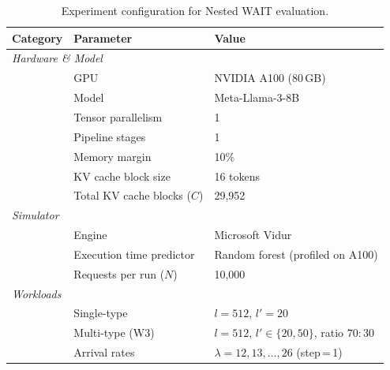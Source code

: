 
\begin{table}[htbp]
\centering
\caption{Experiment configuration for Nested WAIT evaluation.}
\label{tab:experiment_setup}
\begin{tabular}{lll}
\toprule
\textbf{Category} & \textbf{Parameter} & \textbf{Value} \\
\midrule
\multicolumn{3}{l}{\textit{Hardware \& Model}} \\
& GPU & NVIDIA A100 (80\,GB) \\
& Model & Meta-Llama-3-8B \\
& Tensor parallelism & 1 \\
& Pipeline stages & 1 \\
& Memory margin & 10\% \\
& KV cache block size & 16 tokens \\
& Total KV cache blocks ($C$) & 29{,}952 \\
\midrule
\multicolumn{3}{l}{\textit{Simulator}} \\
& Engine & Microsoft Vidur \citep{agrawal2024vidur} \\
& Execution time predictor & Random forest (profiled on A100) \\
& Requests per run ($N$) & 10{,}000 \\
\midrule
\multicolumn{3}{l}{\textit{Workloads}} \\
& Single-type & $l = 512$, $l' = 20$ \\
& Multi-type (W3) & $l = 512$, $l' \in \{20, 50\}$, ratio $70\!:\!30$ \\
& Arrival rates & $\lambda = 12, 13, \ldots, 26$ (step\,=\,1) \\
\bottomrule
\end{tabular}
\end{table}


